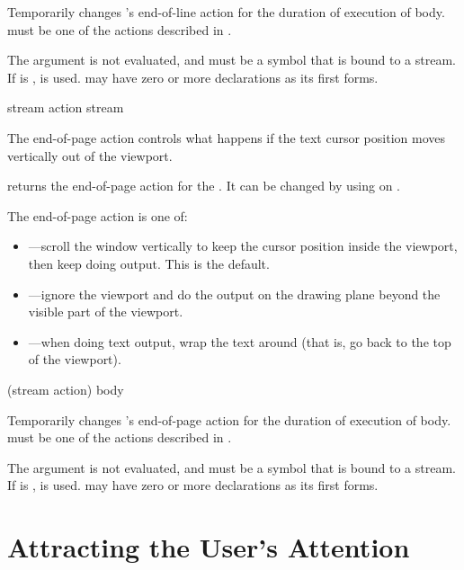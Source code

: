 Temporarily changes 's end-of-line action for the duration of
execution of body.   must be one of the actions described in
.

The  argument is not evaluated, and must be a symbol that is bound
to a stream.  If  is ,  is used.
 may have zero or more declarations as its first forms.


 {stream}
 {action stream}

The end-of-page action controls what happens if the text cursor position moves
vertically out of the viewport.

 returns the end-of-page action for the
 .  It can be changed by using
 on .

The end-of-page action is one of: 

\begin{itemize}
\item {}---scroll the window vertically to keep the cursor position
inside the viewport, then keep doing output.  This is the default.

\item {}---ignore the viewport and do the output on the drawing plane
beyond the visible part of the viewport.

\item {}---when doing text output, wrap the text around (that is, go back
to the top of the viewport).
\end{itemize}

 {(stream action) \body body}

Temporarily changes 's end-of-page action for the duration of
execution of body.   must be one of the actions described in
.

The  argument is not evaluated, and must be a symbol that is bound
to a stream.  If  is ,  is used.
 may have zero or more declarations as its first forms.


\section {Attracting the User's Attention}


